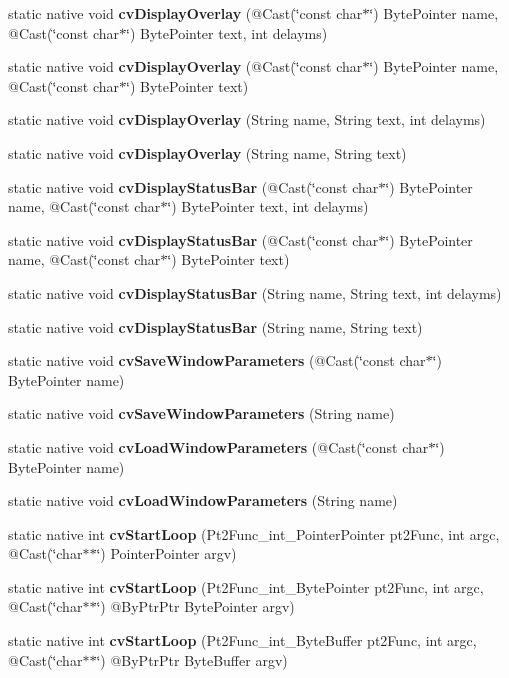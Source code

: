 \begin{DoxyCompactItemize}
static native void {\bfseries cv\+Display\+Overlay} (@Cast(\char`\"{}const char$\ast$\char`\"{}) Byte\+Pointer name, @Cast(\char`\"{}const char$\ast$\char`\"{}) Byte\+Pointer text, int delayms)
\item 
static native void {\bfseries cv\+Display\+Overlay} (@Cast(\char`\"{}const char$\ast$\char`\"{}) Byte\+Pointer name, @Cast(\char`\"{}const char$\ast$\char`\"{}) Byte\+Pointer text)
\item 
static native void {\bfseries cv\+Display\+Overlay} (String name, String text, int delayms)
\item 
static native void {\bfseries cv\+Display\+Overlay} (String name, String text)
\item 
static native void {\bfseries cv\+Display\+Status\+Bar} (@Cast(\char`\"{}const char$\ast$\char`\"{}) Byte\+Pointer name, @Cast(\char`\"{}const char$\ast$\char`\"{}) Byte\+Pointer text, int delayms)
\item 
static native void {\bfseries cv\+Display\+Status\+Bar} (@Cast(\char`\"{}const char$\ast$\char`\"{}) Byte\+Pointer name, @Cast(\char`\"{}const char$\ast$\char`\"{}) Byte\+Pointer text)
\item 
static native void {\bfseries cv\+Display\+Status\+Bar} (String name, String text, int delayms)
\item 
static native void {\bfseries cv\+Display\+Status\+Bar} (String name, String text)
\item 
static native void {\bfseries cv\+Save\+Window\+Parameters} (@Cast(\char`\"{}const char$\ast$\char`\"{}) Byte\+Pointer name)
\item 
static native void {\bfseries cv\+Save\+Window\+Parameters} (String name)
\item 
static native void {\bfseries cv\+Load\+Window\+Parameters} (@Cast(\char`\"{}const char$\ast$\char`\"{}) Byte\+Pointer name)
\item 
static native void {\bfseries cv\+Load\+Window\+Parameters} (String name)
\item 
static native int {\bfseries cv\+Start\+Loop} (Pt2\+Func\+\_\+int\+\_\+\+Pointer\+Pointer pt2\+Func, int argc, @Cast(\char`\"{}char$\ast$$\ast$\char`\"{}) Pointer\+Pointer argv)
\item 
static native int {\bfseries cv\+Start\+Loop} (Pt2\+Func\+\_\+int\+\_\+\+Byte\+Pointer pt2\+Func, int argc, @Cast(\char`\"{}char$\ast$$\ast$\char`\"{}) @By\+Ptr\+Ptr Byte\+Pointer argv)
\item 
static native int {\bfseries cv\+Start\+Loop} (Pt2\+Func\+\_\+int\+\_\+\+Byte\+Buffer pt2\+Func, int argc, @Cast(\char`\"{}char$\ast$$\ast$\char`\"{}) @By\+Ptr\+Ptr Byte\+Buffer argv)
$$
\end{DoxyCompactItemize}
